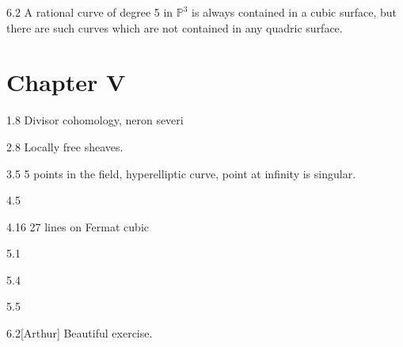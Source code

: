 \begin{manualexercise}{6.2}
	A rational curve of degree 5 in $\mathbb{P}^{3}$ is always contained in a cubic surface, but there  are such curves which are not contained in any quadric surface.  
\end{manualexercise}

\section{Chapter V}

\begin{manualexercise}{1.8}
	Divisor cohomology, neron severi
\end{manualexercise}

\begin{manualexercise}{2.8}
	Locally free sheaves.
\end{manualexercise}

\begin{manualexercise}{3.5}
	5 points in the field, hyperelliptic curve, point at infinity is singular.
\end{manualexercise}

\begin{manualexercise}{4.5}
	
\end{manualexercise}

\begin{manualexercise}{4.16}
	27 lines on Fermat cubic
\end{manualexercise}

\begin{manualexercise}{5.1}
	
\end{manualexercise}

\begin{manualexercise}{5.4}
	
\end{manualexercise}

\begin{manualexercise}{5.5}
	
\end{manualexercise}

\begin{manualexercise}{6.2}[Arthur]
	Beautiful exercise.
\end{manualexercise}


